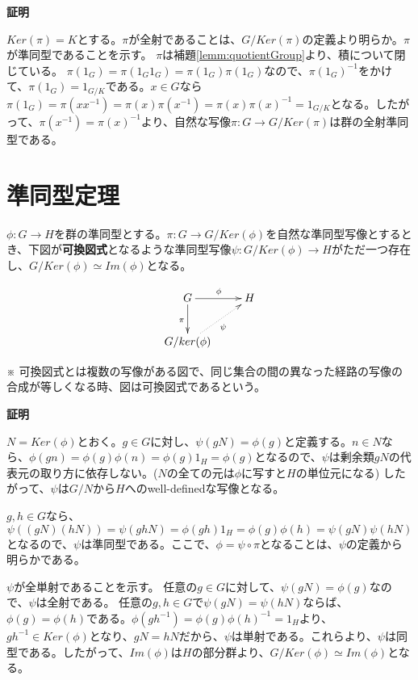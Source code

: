 \documentclass[dvipdfmx,autodetect-engine]{jsarticle}
\begin{document}
{\bf 証明}

$Ker(\pi) = K$とする。$\pi$が全射であることは、$G/Ker(\pi)$の定義より明らか。$\pi$が準同型であることを示す。
$\pi$は補題\ref{lemm:quotientGroup}より、積について閉じている。 $\pi(1_G) = \pi(1_G1_G) = \pi(1_G)\pi(1_G)$なので、$\pi(1_G)^{-1}$をかけて、$\pi(1_G) = 1_{G/K}$である。$x \in G$なら$\pi(1_G) = \pi(xx^{-1}) = \pi(x)\pi(x^{-1}) = \pi(x)\pi(x)^{-1} = 1_{G/K}$となる。したがって、$\pi(x^{-1}) = \pi(x)^{-1}$より、自然な写像$\pi: G \to G/Ker(\pi)$は群の全射準同型である。

\section{準同型定理}


$\phi: G \to H$を群の準同型とする。$\pi: G \to G/Ker(\phi)$を自然な準同型写像とするとき、下図が{\bf 可換図式}となるような準同型写像$\psi: G/Ker(\phi) \to H$がただ一つ存在し、$G/Ker(\phi) \simeq Im(\phi)$となる。

\[
\xymatrix{
G \ar[r]^{\phi} \ar[d]_{\pi} & H \\
G/ker(\phi) \ar@{.>}[ru]_{\psi}
}
\]

※ 可換図式とは複数の写像がある図で、同じ集合の間の異なった経路の写像の合成が等しくなる時、図は可換図式であるという。

{\bf 証明}


$N = Ker(\phi)$とおく。$g \in G$に対し、$\psi(gN) = \phi(g)$と定義する。$n \in N$なら、$\phi(gn) = \phi(g)\phi(n) = \phi(g)1_H = \phi(g)$となるので、$\psi$は剰余類$gN$の代表元の取り方に依存しない。($N$の全ての元は$\phi$に写すと$H$の単位元になる)
したがって、$\psi$は$G/N$から$H$へのwell-definedな写像となる。

$g, h \in G$なら、
$$
\psi((gN)(hN)) = \psi(ghN) = \phi(gh)1_H = \phi(g)\phi(h) =\psi(gN)\psi(hN)
$$
となるので、$\psi$は準同型である。ここで、$\phi = \psi \circ \pi$となることは、$\psi$の定義から明らかである。

$\psi$が全単射であることを示す。
任意の$g \in G$に対して、$\psi(gN) = \phi(g)$なので、$\psi$は全射である。
任意の$g, h \in G$で$\psi(gN) = \psi(hN)$ならば、$\phi(g) = \phi(h)$である。$\phi(gh^{-1}) = \phi(g)\phi(h)^{-1} = 1_H$より、$gh^{-1} \in Ker(\phi)$となり、$gN = hN$だから、$\psi$は単射である。これらより、$\psi$は同型である。したがって、$Im(\phi)$は$H$の部分群より、$G/Ker(\phi) \simeq Im(\phi)$となる。
\end{document}
